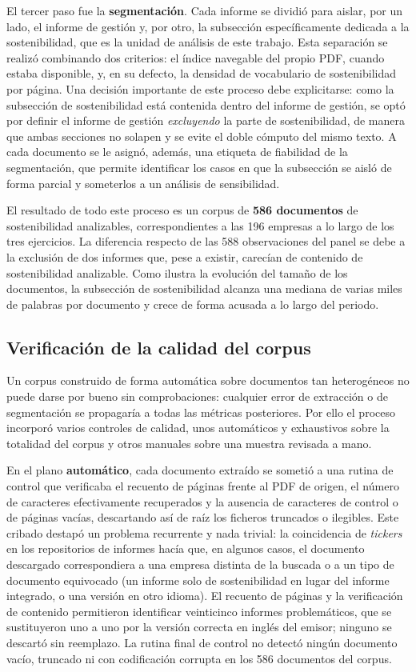 El tercer paso fue la \textbf{segmentación}. Cada informe se dividió para aislar,
por un lado, el informe de gestión y, por otro, la subsección específicamente dedicada a la
sostenibilidad, que es la unidad de análisis de este trabajo. Esta separación se realizó
combinando dos criterios: el índice navegable del propio PDF, cuando estaba disponible, y, en su
defecto, la densidad de vocabulario de sostenibilidad por página. Una decisión importante de
este proceso debe explicitarse: como la subsección de sostenibilidad está contenida dentro del
informe de gestión, se optó por definir el informe de gestión \textit{excluyendo} la parte de
sostenibilidad, de manera que ambas secciones no solapen y se evite el doble cómputo del mismo
texto. A cada documento se le asignó, además, una etiqueta de fiabilidad de la segmentación,
que permite identificar los casos en que la subsección se aisló de forma parcial y someterlos a
un análisis de sensibilidad.

El resultado de todo este proceso es un corpus de \textbf{586 documentos} de sostenibilidad
analizables, correspondientes a las 196 empresas a lo largo de los tres ejercicios. La
diferencia respecto de las 588 observaciones del panel se debe a la exclusión de dos informes
que, pese a existir, carecían de contenido de sostenibilidad analizable. Como ilustra la
evolución del tamaño de los documentos, la subsección de sostenibilidad alcanza una mediana de varias
miles de palabras por documento y crece de forma acusada a lo largo del periodo.

\subsection{Verificación de la calidad del corpus}
\label{sec:qa-corpus}

Un corpus construido de forma automática sobre documentos tan heterogéneos no puede darse por
bueno sin comprobaciones: cualquier error de extracción o de segmentación se propagaría a todas
las métricas posteriores. Por ello el proceso incorporó varios controles de calidad, unos
automáticos y exhaustivos sobre la totalidad del corpus y otros manuales sobre una muestra
revisada a mano.

En el plano \textbf{automático}, cada documento extraído se sometió a una rutina de control que
verificaba el recuento de páginas frente al PDF de origen, el número de caracteres efectivamente
recuperados y la ausencia de caracteres de control o de páginas vacías, descartando así de raíz
los ficheros truncados o ilegibles. Este cribado destapó un problema recurrente y nada trivial:
la coincidencia de \textit{tickers} en los repositorios de informes hacía que, en algunos casos,
el documento descargado correspondiera a una empresa distinta de la buscada o a un tipo de
documento equivocado (un informe solo de sostenibilidad en lugar del informe integrado, o una
versión en otro idioma). El recuento de páginas y la verificación de contenido permitieron
identificar veinticinco informes problemáticos, que se sustituyeron uno a uno por la versión
correcta en inglés del emisor; ninguno se descartó sin reemplazo. La rutina final de control no
detectó ningún documento vacío, truncado ni con codificación corrupta en los 586 documentos del
corpus.

